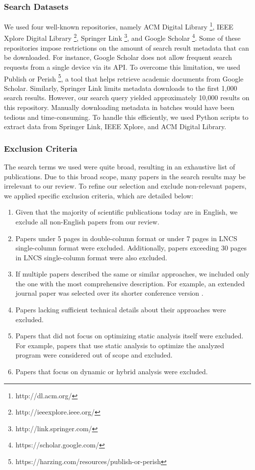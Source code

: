 \subsubsection{Search Datasets}
We used four well-known repositories, namely ACM Digital Library \footnote[1]{http://dl.acm.org/}, IEEE Xplore Digital Library \footnote[2]{http://ieeexplore.ieee.org/}, Springer Link \footnote[3]{http://link.springer.com/}, and Google Scholar \footnote[4]{https://scholar.google.com/}. Some of these repositories impose restrictions on the amount of search result metadata that can be downloaded. For instance, Google Scholar does not allow frequent search requests from a single device via its API. To overcome this limitation, we used Publish or Perish \footnote[5]{https://harzing.com/resources/publish-or-perish}, a tool that helps retrieve academic documents from Google Scholar. Similarly, Springer Link limits metadata downloads to the first 1,000 search results. However, our search query yielded approximately 10,000 results on this repository. Manually downloading metadata in batches would have been tedious and time-consuming. To handle this efficiently, we used Python scripts to extract data from Springer Link, IEEE Xplore, and ACM Digital Library.

\subsubsection{Exclusion Criteria}
The search terms we used were quite broad, resulting in an exhaustive list of publications. Due to this broad scope, many papers in the search results may be irrelevant to our review. To refine our selection and exclude non-relevant papers, we applied specific exclusion criteria, which are detailed below:

\begin{enumerate}
    \item Given that the majority of scientific publications today are in English, we exclude all non-English papers from our review.
    \item Papers under 5 pages in double-column format or under 7 pages in LNCS single-column format were excluded. Additionally, papers exceeding 30 pages in LNCS single-column format were also excluded.
    \item If multiple papers described the same or similar approaches, we included only the one with the most comprehensive description. For example, an extended journal paper \cite{lu2021eagle} was selected over its shorter conference version \cite{lu2020precision}.
    \item Papers lacking sufficient technical details about their approaches were excluded.
    \item Papers that did not focus on optimizing static analysis itself were excluded. For example, papers that use static analysis to optimize the analyzed program were considered out of scope and excluded.
    \item Papers that focus on dynamic or hybrid analysis were excluded.
\end{enumerate}


